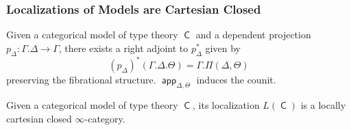 \documentclass{beamer}
\DeclareMathOperator{\sfC}{\mathsf{C}}
\DeclareMathOperator{\app}{\mathsf{app}}
\begin{document}
\begin{frame}
  \frametitle{Localizations of Models are Cartesian Closed}

  \begin{lem}[Kapulkin 2015]
    Given a categorical model of type theory $\sfC$ and a dependent projection
    $p_\Delta\colon\Gamma.\Delta\rightarrow\Gamma$, there exists a right adjoint
    to $p_\Delta^*$ given by
    \[(p_\Delta)^*(\Gamma.\Delta.\Theta)=\Gamma.\Pi(\Delta,\Theta)\]
    preserving the fibrational structure. $\app_{\Delta,\Theta}$ induces the
    counit.
  \end{lem}

  \begin{thm}[Kapulkin 2015]
    Given a categorical model of type theory $\sfC$, its localization
    $L(\sfC)$ is a locally cartesian closed $\infty$-category.
  \end{thm}
\end{frame}

\begin{frame}
\end{frame}
\end{document}
